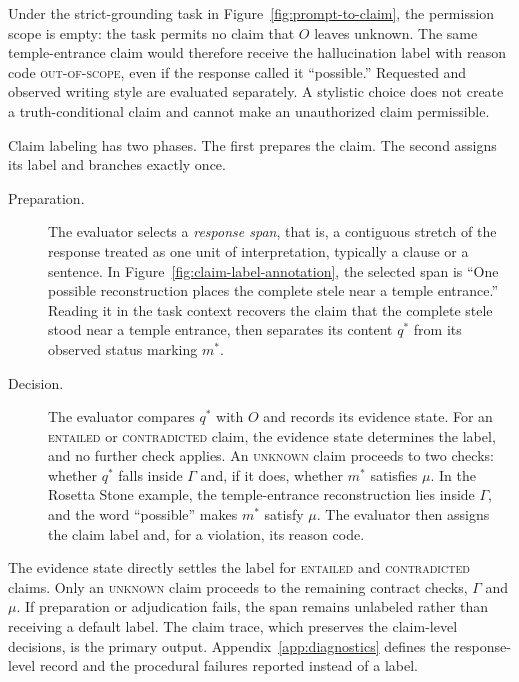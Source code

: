 \documentclass{clv2025}
\begin{document}
Under the strict-grounding task in Figure~\ref{fig:prompt-to-claim}, the
permission scope is empty: the task permits no claim that $O$ leaves unknown.
The same temple-entrance claim would therefore receive the hallucination label
with reason code \textsc{out-of-scope}, even if the response called it
``possible.'' Requested and observed writing style are evaluated separately.
A stylistic choice does not create a truth-conditional claim and cannot make an
unauthorized claim permissible.

Claim labeling has two phases. The first prepares the claim. The second assigns
its label and branches exactly once.

\begin{description}
  \item[Preparation.] The evaluator selects a \emph{response span}, that is, a
        contiguous stretch of the response treated as one unit of
        interpretation, typically a clause or a sentence. In
        Figure~\ref{fig:claim-label-annotation}, the selected span is ``One
        possible reconstruction places the complete stele near a temple
        entrance.'' Reading it in the task context recovers the claim that the
        complete stele stood near a temple entrance, then separates its content
        $q^*$ from its observed status marking $m^*$.
  \item[Decision.] The evaluator compares $q^*$ with $O$ and records its
        evidence state. For an \textsc{entailed} or \textsc{contradicted}
        claim, the evidence state determines the label, and no further check
        applies. An \textsc{unknown} claim proceeds to two checks: whether
        $q^*$ falls inside $\Gamma$ and, if it does, whether $m^*$ satisfies
        $\mu$. In the Rosetta Stone example, the temple-entrance reconstruction
        lies inside $\Gamma$, and the word ``possible'' makes $m^*$ satisfy
        $\mu$. The evaluator then assigns the claim label and, for a violation,
        its reason code.
\end{description}

The evidence state directly settles the label for \textsc{entailed} and
\textsc{contradicted} claims. Only an \textsc{unknown} claim proceeds to the
remaining contract checks, $\Gamma$ and $\mu$.
If preparation or adjudication fails, the span remains unlabeled rather than
receiving a default label. The claim trace, which preserves the claim-level
decisions, is the primary output.
Appendix~\ref{app:diagnostics} defines the response-level record and the
procedural failures reported instead of a label.
\end{document}
